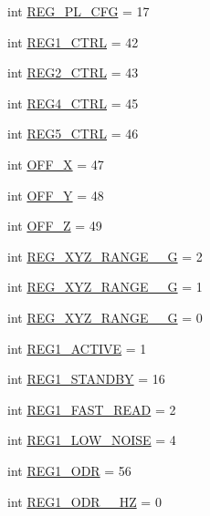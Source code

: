 \begin{DoxyCompactItemize}
int \hyperlink{classmma8451_1_1mma8451_a7286e9ba7589d3c8931bb1273e14878c}{R\+E\+G\+\_\+\+P\+L\+\_\+\+C\+FG} = 17
\item 
int \hyperlink{classmma8451_1_1mma8451_a8326d71ec08fc3ab46e590e01c6c5e5e}{R\+E\+G1\+\_\+\+C\+T\+RL} = 42
\item 
int \hyperlink{classmma8451_1_1mma8451_a397c779fcf31f69d60acf0d9fd091bf3}{R\+E\+G2\+\_\+\+C\+T\+RL} = 43
\item 
int \hyperlink{classmma8451_1_1mma8451_a1e75cdb075f50da55a6001ca9621a459}{R\+E\+G4\+\_\+\+C\+T\+RL} = 45
\item 
int \hyperlink{classmma8451_1_1mma8451_a3a81ee7140f76b7b7febec54b22e64fe}{R\+E\+G5\+\_\+\+C\+T\+RL} = 46
\item 
int \hyperlink{classmma8451_1_1mma8451_afea71fa86d33a60e8346d4f447300a3c}{O\+F\+F\+\_\+X} = 47
\item 
int \hyperlink{classmma8451_1_1mma8451_a201f94b1fcb57e2eb85c36ee04561f72}{O\+F\+F\+\_\+Y} = 48
\item 
int \hyperlink{classmma8451_1_1mma8451_a9711d7d17e5c1f215523e1f0a1990f5b}{O\+F\+F\+\_\+Z} = 49
\item 
int \hyperlink{classmma8451_1_1mma8451_ad69d609cbce3f98e6d0203fc038673a1}{R\+E\+G\+\_\+\+X\+Y\+Z\+\_\+\+R\+A\+N\+G\+E\+\_\+\_\+G} = 2
\item 
int \hyperlink{classmma8451_1_1mma8451_ac6ee56e5a622f588dbd538e1041e6367}{R\+E\+G\+\_\+\+X\+Y\+Z\+\_\+\+R\+A\+N\+G\+E\+\_\+\_\+G} = 1
\item 
int \hyperlink{classmma8451_1_1mma8451_ac62b64468320473a459283f2331152c7}{R\+E\+G\+\_\+\+X\+Y\+Z\+\_\+\+R\+A\+N\+G\+E\+\_\+\_\+G} = 0
\item 
int \hyperlink{classmma8451_1_1mma8451_a4e32292f76b78b01d9a06d625c8d305d}{R\+E\+G1\+\_\+\+A\+C\+T\+I\+VE} = 1
\item 
int \hyperlink{classmma8451_1_1mma8451_aa0595af0820e9008553320d475304799}{R\+E\+G1\+\_\+\+S\+T\+A\+N\+D\+BY} = 16
\item 
int \hyperlink{classmma8451_1_1mma8451_af61e366c70cfe918b04a7b153c200b7d}{R\+E\+G1\+\_\+\+F\+A\+S\+T\+\_\+\+R\+E\+AD} = 2
\item 
int \hyperlink{classmma8451_1_1mma8451_aee66b35034ab4680549d4771bc529b7d}{R\+E\+G1\+\_\+\+L\+O\+W\+\_\+\+N\+O\+I\+SE} = 4
\item 
int \hyperlink{classmma8451_1_1mma8451_a8398c8709186519753c349a78f4e3d23}{R\+E\+G1\+\_\+\+O\+DR} = 56
\item 
int \hyperlink{classmma8451_1_1mma8451_a82229a54ed10122cfebecaef1669084a}{R\+E\+G1\+\_\+\+O\+D\+R\+\_\+\_\+\+HZ} = 0

\end{DoxyCompactItemize}
